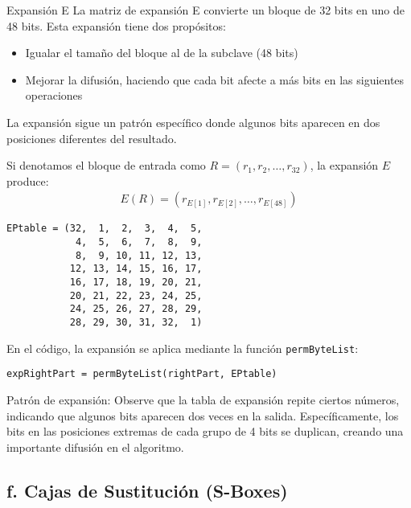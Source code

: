 \begin{cryptomethod}{Expansión E}
	La matriz de expansión E convierte un bloque de 32 bits en uno de 48 bits. Esta expansión tiene dos propósitos:
	\begin{itemize}
		\item Igualar el tamaño del bloque al de la subclave (48 bits)
		\item Mejorar la difusión, haciendo que cada bit afecte a más bits en las siguientes operaciones
	\end{itemize}

	La expansión sigue un patrón específico donde algunos bits aparecen en dos posiciones diferentes del resultado.

	Si denotamos el bloque de entrada como $R = (r_1, r_2, \ldots, r_{32})$, la expansión $E$ produce:
	\begin{align}
		E(R) = (r_{E[1]}, r_{E[2]}, \ldots, r_{E[48]})
	\end{align}
\end{cryptomethod}

\begin{lstlisting}[style=cryptoalgo, caption={Matriz de Expansión E}, label=lst:expansion]
EPtable = (32,  1,  2,  3,  4,  5,
            4,  5,  6,  7,  8,  9,
            8,  9, 10, 11, 12, 13,
           12, 13, 14, 15, 16, 17,
           16, 17, 18, 19, 20, 21,
           20, 21, 22, 23, 24, 25,
           24, 25, 26, 27, 28, 29,
           28, 29, 30, 31, 32,  1)
\end{lstlisting}

En el código, la expansión se aplica mediante la función \texttt{permByteList}:

\begin{lstlisting}[style=cryptoalgo]
expRightPart = permByteList(rightPart, EPtable)
\end{lstlisting}

\begin{securitygoodpractice}
	Patrón de expansión: Observe que la tabla de expansión repite ciertos números, indicando que algunos bits aparecen dos veces en la salida. Específicamente, los bits en las posiciones extremas de cada grupo de 4 bits se duplican, creando una importante difusión en el algoritmo.
\end{securitygoodpractice}

\subsection{f. Cajas de Sustitución (S-Boxes)}


